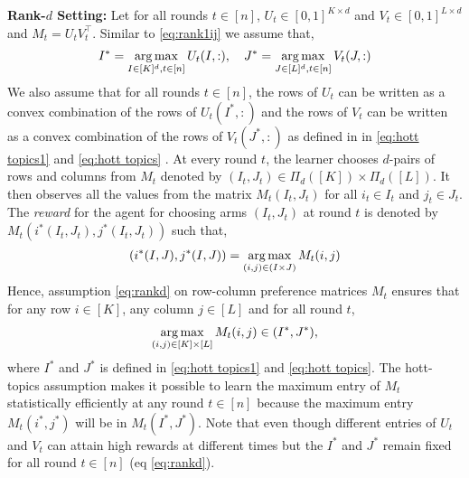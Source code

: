 \textbf{Rank-$d$ Setting:} Let for all rounds $t\in[n]$, $U_t \in [0,1]^{K\times d}$ and $V_t \in [0,1]^{L\times d}$ and $M_t = U_t V_t^{\intercal}$. Similar to \eqref{eq:rank1ij} we assume that,
\begin{align}
I^\ast = \mathop{\rm arg\,max}_{I\in[K]^d, t\in [n]}U_{t}(I,:), \hspace*{1em} J^\ast = \mathop{\rm arg\,max}_{J\in[L]^d, t\in [n]}V_{t}(J,:) \label{eq:rankd}
\end{align}
We also assume that for all rounds $t\in [n]$, the rows of $U_t$ can be written as a convex combination of the rows of $U_t(I^\ast, :)$ and the rows of $V_t$ can be written as a convex combination of the rows of $V_t(J^\ast, :)$ as defined in in \eqref{eq:hott topics1} and \eqref{eq:hott topics} .
At every round $t$, the learner chooses $d$-pairs of rows and columns from $M_t$ denoted by $(I_t,J_t)\in \Pi_d([K])\times \Pi_d([L])$. It then observes all the values from the matrix $M_{t}(I_t,J_t)$ for all $i_t\in I_t$ and $j_t \in J_t$. The \emph{reward} for the agent for choosing arms $(I_t,J_t)$ at round $t$ is denoted by $M_t(i^\ast(I_t,J_t),j^\ast(I_t,J_t))$ such that,
\begin{align}
  (i^\ast(I,J),j^\ast(I,J)) = \mathop{\rm arg\,max}_{(i,j) \in (I\times J)} M_{t}(i,j)
  \label{eq:reward}
\end{align}
Hence, assumption \eqref{eq:rankd} on row-column preference matrices $M_t$ ensures that for any row $i \in [K]$, any column $j \in [L]$ and for all round $t$,
\begin{align}
  \mathop{\rm arg\,max}_{(i, j) \in [K] \times [L]} M_t(i, j) \in (I^\ast, J^\ast) \label{eq:rewardProp},
\end{align}
where $I^\ast$ and $J^\ast$ is defined in \eqref{eq:hott topics1} and \eqref{eq:hott topics}. The hott-topics assumption makes it possible to learn the maximum entry of $M_t$ statistically efficiently at any round $t\in[n]$ because the maximum entry $M_t(i^*,j^*)$ will be in $M_t(I^*,J^*)$. Note that even though different entries of $U_t$ and $V_t$ can attain high rewards at different times but the $I^*$ and $J^*$ remain fixed for all round $t\in[n]$ (eq \ref{eq:rankd}). 

